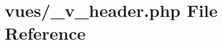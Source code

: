\hypertarget{__v__header_8php}{}\section{vues/\+\_\+v\+\_\+header.php File Reference}
\label{__v__header_8php}
